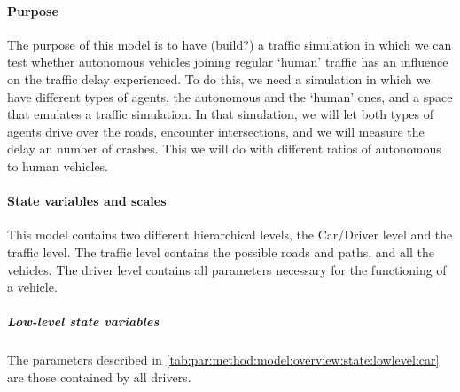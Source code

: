 \paragraph{Purpose}
\label{par:method:model:overview:purpose}

The purpose of this model is to have (build?) a traffic simulation in which we can test whether autonomous vehicles joining regular `human' traffic has an influence on the traffic delay experienced. To do this, we need a simulation in which we have different types of agents, the autonomous and the `human' ones, and a space that emulates a traffic simulation. In that simulation, we will let both types of agents drive over the roads, encounter intersections, and we will measure the delay an number of crashes. This we will do with different ratios of autonomous to human vehicles. 

\paragraph{State variables and scales}
\label{par:method:model:overview:state}

This model contains two different hierarchical levels, the Car/Driver level and the traffic level. The traffic level contains the possible roads and paths, and all the vehicles. The driver level contains all parameters necessary for the functioning of a vehicle.  

	\subparagraph{Low-level state variables}
	The parameters described in \cref{tab:par:method:model:overview:state:lowlevel:car} are those contained by all drivers. 



